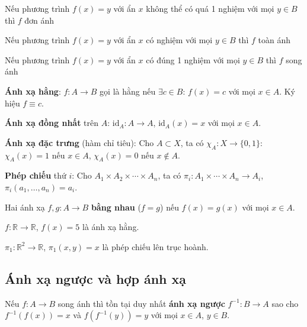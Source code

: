 \documentclass[12pt,a4paper]{article}
\begin{document}
\begin{luuy}
  Nếu phương trình $f(x) = y$ với ẩn $x$ không thể có quá 1 nghiệm với mọi $y \in B$ thì $f$ đơn ánh
  
  Nếu phương trình $f(x) = y$ với ẩn $x$ có nghiệm với mọi $y \in B$ thì $f$ toàn ánh
  
  Nếu phương trình $f(x) = y$ với ẩn $x$ có đúng 1 nghiệm với mọi $y \in B$ thì $f$ song ánh
\end{luuy}

\begin{dinhnghia}
  \textbf{Ánh xạ hằng}: $f: A \to B$ gọi là hằng nếu $\exists c \in B$: $f(x) = c$ với mọi $x \in A$. Ký hiệu $f \equiv c$.
\end{dinhnghia}

\begin{dinhnghia}
  \textbf{Ánh xạ đồng nhất} trên $A$: $\mathrm{id}_A: A \to A$, $\mathrm{id}_A(x) = x$ với mọi $x \in A$.
\end{dinhnghia}

\begin{dinhnghia}
  \textbf{Ánh xạ đặc trưng} (hàm chỉ tiêu): Cho $A \subset X$, ta có $\chi_A: X \to \{0, 1\}$: $\chi_A(x) = 1$ nếu $x \in A$, $\chi_A(x) = 0$ nếu $x \notin A$.
\end{dinhnghia}

\begin{dinhnghia}
  \textbf{Phép chiếu} thứ $i$: Cho $A_1 \times A_2 \times \cdots \times A_n$, ta có $\pi_i: A_1 \times \cdots \times A_n \to A_i$, $\pi_i(a_1, \ldots, a_n) = a_i$.
\end{dinhnghia}

\begin{dinhnghia}
  Hai ánh xạ $f, g: A \to B$ \textbf{bằng nhau} ($f = g$) nếu $f(x) = g(x)$ với mọi $x \in A$.
\end{dinhnghia}

\begin{vidu}
  $f: \mathbb{R} \to \mathbb{R}$, $f(x) = 5$ là ánh xạ hằng. 
  
  $\pi_1: \mathbb{R}^2 \to \mathbb{R}$, $\pi_1(x,y) = x$ là phép chiếu lên trục hoành.
\end{vidu}

\subsection{Ánh xạ ngược và hợp ánh xạ}

\begin{dinhnghia}
  Nếu $f: A \to B$ song ánh thì tồn tại duy nhất \textbf{ánh xạ ngược} $f^{-1}: B \to A$ sao cho $f^{-1}(f(x)) = x$ và $f(f^{-1}(y)) = y$ với mọi $x \in A$, $y \in B$.
\end{dinhnghia}
\end{document}
